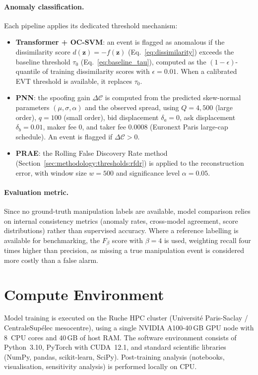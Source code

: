 \documentclass[11pt]{report}
\begin{document}
\paragraph{Anomaly classification.}
Each pipeline applies its dedicated threshold mechanism:
\begin{itemize}
  \item \textbf{Transformer + OC-SVM}: an event is flagged as anomalous if the dissimilarity score $d(\mathbf{z}) = -f(\mathbf{z})$ (Eq.~\ref{eq:dissimilarity}) exceeds the baseline threshold $\tau_0$ (Eq.~\ref{eq:baseline_tau}), computed as the $(1 - \epsilon)$-quantile of training dissimilarity scores with $\epsilon = 0.01$. When a calibrated EVT threshold is available, it replaces $\tau_0$. %
  \item \textbf{PNN}: the spoofing gain $\Delta\mathcal{C}$ is computed from the predicted skew-normal parameters $(\mu, \sigma, \alpha)$ and the observed spread, using $Q = 4{,}500$ (large order), $q = 100$ (small order), bid displacement $\delta_a = 0$, ask displacement $\delta_b = 0.01$, maker fee $0$, and taker fee $0.0008$ (Euronext Paris large-cap schedule). An event is flagged if $\Delta\mathcal{C} > 0$.
  \item \textbf{PRAE}: the Rolling False Discovery Rate method (Section~\ref{sec:methodology:thresholds:rfdr}) is applied to the reconstruction error, with window size $w = 500$ and significance level $\alpha = 0.05$.
\end{itemize}

\paragraph{Evaluation metric.}
Since no ground-truth manipulation labels are available, model comparison relies on internal consistency metrics (anomaly rates, cross-model agreement, score distributions) rather than supervised accuracy. Where a reference labelling is available for benchmarking, the $F_\beta$ score with $\beta = 4$ is used, weighting recall four times higher than precision, as missing a true manipulation event is considered more costly than a false alarm.


\section{Compute Environment}\label{sec:data:compute}

Model training is executed on the Ruche HPC cluster (Universit\'e Paris-Saclay / CentraleSup\'elec mesocentre), using a single NVIDIA A100-40\,GB GPU node with 8~CPU cores and 40\,GB of host RAM. The software environment consists of Python~3.10, PyTorch with CUDA~12.1, and standard scientific libraries (NumPy, pandas, scikit-learn, SciPy). Post-training analysis (notebooks, visualisation, sensitivity analysis) is performed locally on CPU.
\end{document}
